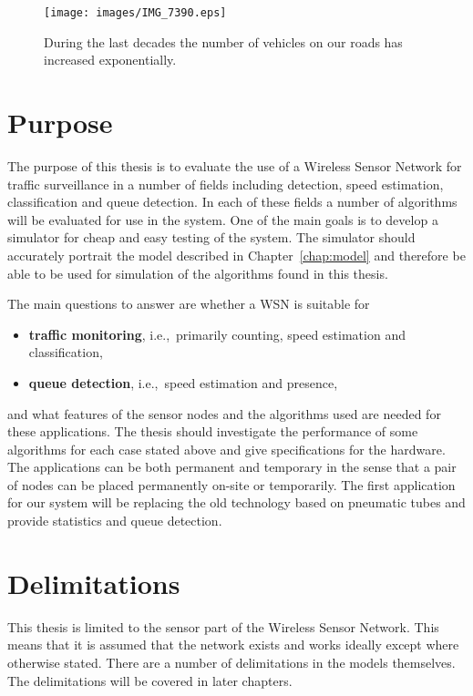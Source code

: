 \begin{figure}[fht]
 \centering
 \texttt{[image: images/IMG\_7390.eps]}
 \caption[Traffic has increased exponentially]{During the last decades the number of vehicles on our roads has increased exponentially.}
 \label{fig:traffic}
\end{figure}

\section{Purpose} %

The purpose of this thesis is to evaluate the use of a Wireless Sensor Network for traffic surveillance in a number of fields including detection, speed estimation, classification and queue detection. In each of these fields a number of algorithms will be evaluated for use in the system. One of the main goals is to develop a simulator for cheap and easy testing of the system. The simulator should accurately portrait the model described in Chapter~\ref{chap:model} and therefore be able to be used for simulation of the algorithms found in this thesis.

The main questions to answer are whether a WSN is suitable for 
\begin{itemize}
	\item \textbf{traffic monitoring}, i.e.,~primarily counting, speed estimation and classification,
	\item \textbf{queue detection}, i.e.,~speed estimation and presence,
\end{itemize}
and what features of the sensor nodes and the algorithms used are needed for these applications. The thesis should investigate the performance of some algorithms for each case stated above and give specifications for the hardware. The applications can be both permanent and temporary in the sense that a pair of nodes can be placed permanently on-site or temporarily. The first application for our system will be replacing the old technology based on pneumatic tubes and provide statistics and queue detection.

\section{Delimitations} %

This thesis is limited to the sensor part of the Wireless Sensor Network. This means that it is assumed that the network exists and works ideally except where otherwise stated. There are a number of delimitations in the models themselves. The delimitations will be covered in later chapters.
